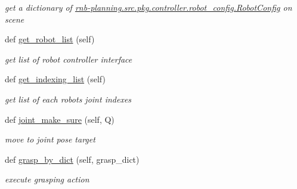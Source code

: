 \begin{DoxyCompactItemize}
\begin{DoxyCompactList}\small\item\em get a dictionary of \hyperlink{classrnb-planning_1_1src_1_1pkg_1_1controller_1_1robot__config_1_1_robot_config}{rnb-\/planning.\+src.\+pkg.\+controller.\+robot\+\_\+config.\+Robot\+Config} on scene \end{DoxyCompactList}\item 
\mbox{\label{classrnb-planning_1_1src_1_1pkg_1_1controller_1_1combined__robot_1_1_combined_robot_a50a9c7f8909916bc5e08ec073c8354fd}} 
def \hyperlink{classrnb-planning_1_1src_1_1pkg_1_1controller_1_1combined__robot_1_1_combined_robot_a50a9c7f8909916bc5e08ec073c8354fd}{get\+\_\+robot\+\_\+list} (self)
\begin{DoxyCompactList}\small\item\em get list of robot controller interface \end{DoxyCompactList}\item 
\mbox{\label{classrnb-planning_1_1src_1_1pkg_1_1controller_1_1combined__robot_1_1_combined_robot_a408aa085631cd2453a28bf2d6ee8c6a4}} 
def \hyperlink{classrnb-planning_1_1src_1_1pkg_1_1controller_1_1combined__robot_1_1_combined_robot_a408aa085631cd2453a28bf2d6ee8c6a4}{get\+\_\+indexing\+\_\+list} (self)
\begin{DoxyCompactList}\small\item\em get list of each robot\textquotesingle{}s joint indexes \end{DoxyCompactList}\item 
def \hyperlink{classrnb-planning_1_1src_1_1pkg_1_1controller_1_1combined__robot_1_1_combined_robot_ac02f08e1c8b30ad707bd5b6a8d635cf0}{joint\+\_\+make\+\_\+sure} (self, Q)
\begin{DoxyCompactList}\small\item\em move to joint pose target \end{DoxyCompactList}\item 
def \hyperlink{classrnb-planning_1_1src_1_1pkg_1_1controller_1_1combined__robot_1_1_combined_robot_ac7425b657ce6d49feb9edd31fb651754}{grasp\+\_\+by\+\_\+dict} (self, grasp\+\_\+dict)
\begin{DoxyCompactList}\small\item\em execute grasping action \end{DoxyCompactList}\item 

\end{DoxyCompactItemize}
